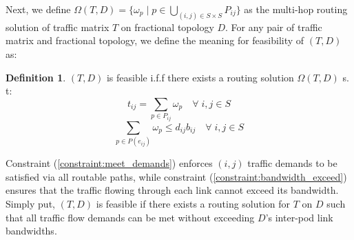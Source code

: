 \documentclass[sigconf]{acmart}
\theoremstyle{definition}
\newtheorem{definition}{Definition}[section]
\begin{document}
Next, we define $\Omega(T, D) = \{\omega_p \; | \; p \in \bigcup\limits_{(i, j) \in S \times S}P_{ij}\}$ as the multi-hop routing solution of traffic matrix $T$ on fractional topology $D$. For any pair of traffic matrix and fractional topology,  we define the meaning for feasibility of $(T , D)$ as:

\begin{definition}
$(T, D)$ is feasible i.f.f there exists a routing solution $\Omega(T, D)$ s. t:
\begin{equation}
    t_{ij} = \sum\limits_{p \in P_{ij}}\omega_p \quad \forall \; i, j \in S
\label{constraint:meet_demands}
\end{equation}
\begin{equation}
    \sum\limits_{p \in P(e_{ij})} \omega_{p} \leq d_{ij}b_{ij} \quad \forall \; i, j \in S
\label{constraint:bandwidth_exceed}
\end{equation}
\label{defn:feasible_fractional_graph}
\end{definition}
Constraint (\ref{constraint:meet_demands}) enforces $(i, j)$ traffic demands to be satisfied via all routable paths, while constraint (\ref{constraint:bandwidth_exceed}) ensures that the traffic flowing through each link cannot exceed its bandwidth. Simply put, $(T, D)$ is feasible if there exists a routing solution for $T$ on $D$ such that all traffic flow demands can be met without exceeding $D$'s inter-pod link bandwidths. 

\end{document}
